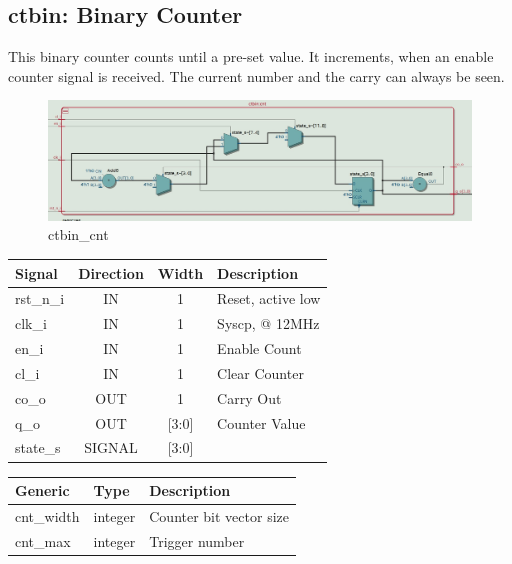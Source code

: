 \documentclass[12pt,a4 paper] {report}
\begin{document}
\newpage

\subsection{ctbin: Binary Counter}
This binary counter counts until a pre-set value. It increments, when an enable counter signal is received. The current 
number and the carry can always be seen.
\begin{figure}[h]
	\centering	
	\includegraphics[scale=0.3]{../png/ctbin_cnt.png}
	\caption{ctbin\_cnt}
\end{figure}
\begin{center}
	\begin{tabular}{ | p{2cm} | c | c | p{5cm} |}
		\hline
		\textbf{Signal} & \textbf{Direction} & \textbf{Width} & \textbf{Description} \\
		\hline	
 		 rst\_n\_i & IN & 1 & Reset, active low \\
 		 \hline
		clk\_i & IN & 1 & Syscp, @ 12MHz \\
		\hline
		en\_i & IN & 1 & Enable Count \\
		\hline
		cl\_i & IN & 1 & Clear Counter \\
		\hline
		co\_o & OUT & 1 & Carry Out \\
		\hline
		q\_o & OUT & [3:0] & Counter Value \\
		\hline
		\hline
		state\_s & SIGNAL & [3:0] & \\
		\hline
	\end{tabular}
\end{center}
\begin{center}
	\begin{tabular}{| p{2cm} | p{2cm} | p{4cm} |}
		\hline
		\textbf{Generic} & \textbf{Type} & \textbf{Description} \\
		\hline
 		cnt\_width & integer & Counter bit vector size \\
		\hline
		cnt\_max & integer & Trigger number \\
		\hline
	\end{tabular}	
\end{center}
\end{document}
